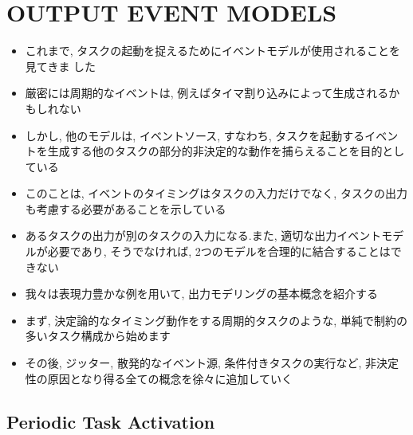 
\section{OUTPUT EVENT MODELS}
\label{sec: output event models}

\begin{frame}{}
    \begin{itemize}
        \item これまで, タスクの起動を捉えるためにイベントモデルが使用されることを見てきま した
        \item 厳密には周期的なイベントは, 例えばタイマ割り込みによって生成されるかもしれない
        \item しかし, 他のモデルは, イベントソース, すなわち, タスクを起動するイベントを生成する他のタスクの部分的非決定的な動作を捕らえることを目的としている
        \item このことは, イベントのタイミングはタスクの入力だけでなく, タスクの出力も考慮する必要があることを示している
    \end{itemize}
\end{frame}

\begin{frame}{}
    \begin{itemize}
        \item あるタスクの出力が別のタスクの入力になる.また, 適切な出力イベントモデルが必要であり, そうでなければ, 2つのモデルを合理的に結合することはできない
    \end{itemize}
\end{frame}

\begin{frame}{}
    \begin{itemize}
        \item 我々は表現力豊かな例を用いて, 出力モデリングの基本概念を紹介する
        \item まず, 決定論的なタイミング動作をする周期的タスクのような, 単純で制約の多いタスク構成から始めます
        \item その後, ジッター, 散発的なイベント源, 条件付きタスクの実行など, 非決定性の原因となり得る全ての概念を徐々に追加していく
    \end{itemize}
\end{frame}


\subsection{Periodic Task Activation}
\label{ssec: periodic task activation}

